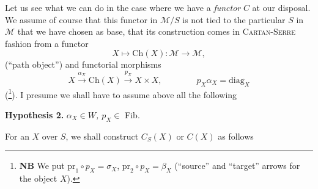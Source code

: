 \documentclass[11pt]{article}
\newcommand{\msp}[1]{\marginpar{\footnotesize [#1]}}
\begin{document}
Let us see what we can do in the case where we have a \textit{functor} $C$ at our disposal. We assume of course that this functor in $\mathcal{M}/S$ \msp{page 101} is not tied to the particular $S$ in $\mathcal{M}$ that we have chosen as base, that its construction comes in \textsc{Cartan-Serre} fashion from a functor
\[
X \longmapsto \mathrm{Ch}(X) : \mathcal{M} \longrightarrow \mathcal{M},
\]
(``path object'') and functorial morphisms
\[
X \xrightarrow{\alpha_X} \mathrm{Ch}(X) \xrightarrow{p_X} X \times X, \qquad\qquad \boxed{p_X\alpha_X = \mathrm{diag}_X}
\]
(\footnote[58]{\textbf{NB} We put $\mathrm{pr}_1 \circ p_X = \sigma_X$, $\mathrm{pr}_2 \circ p_X = \beta_X$ (``source'' and ``target'' arrows for the object $X$).}). I presume we shall have to assume above all the following

\textbf{Hypothesis 2.} \textit{$\alpha_X \in W$, $p_X \in$} Fib.

For an $X$ over $S$, we shall construct $C_S(X)$ or $C(X)$ as follows
\end{document}

